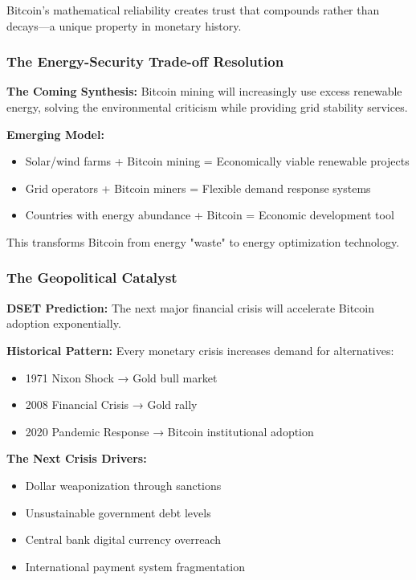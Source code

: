 \documentclass[11pt,oneside]{book}
\begin{document}
Bitcoin's mathematical reliability creates trust that compounds rather than decays—a unique property in monetary history.

\subsubsection{The Energy-Security Trade-off Resolution}

\textbf{The Coming Synthesis:} Bitcoin mining will increasingly use excess renewable energy, solving the environmental criticism while providing grid stability services.

\textbf{Emerging Model:}
\begin{itemize}
\item Solar/wind farms + Bitcoin mining = Economically viable renewable projects
\item Grid operators + Bitcoin miners = Flexible demand response systems
\item Countries with energy abundance + Bitcoin = Economic development tool
\end{itemize}

This transforms Bitcoin from energy "waste" to energy optimization technology.

\subsubsection{The Geopolitical Catalyst}

\textbf{DSET Prediction:} The next major financial crisis will accelerate Bitcoin adoption exponentially.

\textbf{Historical Pattern:} Every monetary crisis increases demand for alternatives:
\begin{itemize}
\item 1971 Nixon Shock → Gold bull market
\item 2008 Financial Crisis → Gold rally
\item 2020 Pandemic Response → Bitcoin institutional adoption
\end{itemize}

\textbf{The Next Crisis Drivers:}
\begin{itemize}
\item Dollar weaponization through sanctions
\item Unsustainable government debt levels
\item Central bank digital currency overreach
\item International payment system fragmentation
\end{itemize}
\end{document}
